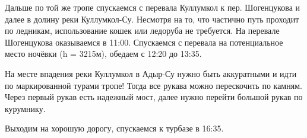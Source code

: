 Дальше по той же тропе спускаемся с перевала Куллумкол к пер. Шогенцукова и далее в долину реки Куллумкол-Су. Несмотря на то, что частично путь проходит
по ледникам, использование кошек или ледоруба не требуется.
На перевале Шогенцукова оказываемся в 11:00. Спускаемся с перевала на потенциальное место ночёвки (h = 3215м), обедаем с 12:20 до 13:35.

На месте впадения реки Куллумкол в Адыр-Су нужно быть аккуратными и идти по маркированной турами тропе! Тогда все рукава можно перескочить по камням.
Через первый рукав есть надежный мост, далее нужно перейти большой рукав по курумнику.

Выходим на хорошую дорогу, спускаемся к турбазе в 16:35.



%



    \FloatBarrier
